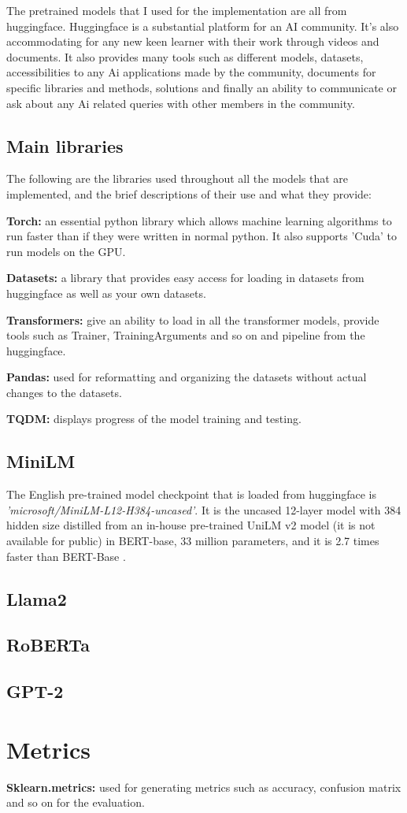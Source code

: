 The pretrained models that I used for the implementation are all from huggingface. Huggingface is a substantial platform for an AI community. It's also accommodating for any new keen learner with their work through videos and documents. It also provides many tools such as different models, datasets, accessibilities to any Ai applications made by the community, documents for specific libraries and methods, solutions and finally an ability to communicate or ask about any Ai related queries with other members in the community.

\subsection{Main libraries}
The following are the libraries used throughout all the models that are implemented, and the brief descriptions of their use and what they provide:

\textbf{Torch:} an essential python library which allows machine learning algorithms to run faster than if they were written in normal python. It also supports 'Cuda' to run models on the GPU.

\textbf{Datasets:} a library that provides easy access for loading in datasets from huggingface as well as your own datasets.

\textbf{Transformers:} give an ability to load in all the transformer models, provide tools such as Trainer, TrainingArguments and so on and pipeline from the huggingface.

\textbf{Pandas:} used for reformatting and organizing the datasets without actual changes to the datasets.

\textbf{TQDM:} displays progress of the model training and testing.


\subsection{MiniLM}
The English pre-trained model checkpoint that is loaded from huggingface is \textit{'microsoft/MiniLM-L12-H384-uncased'}. It is the uncased 12-layer model with 384 hidden size distilled from an in-house pre-trained UniLM v2 model (it is not available for public) in BERT-base, 33 million parameters, and it is 2.7 times faster than BERT-Base \cite{patrickvonplaten}.


\subsection{Llama2}
  
\subsection{RoBERTa}

\subsection{GPT-2}


\section{Metrics}

\textbf{Sklearn.metrics:} used for generating metrics such as accuracy, confusion matrix and so on for the evaluation.
